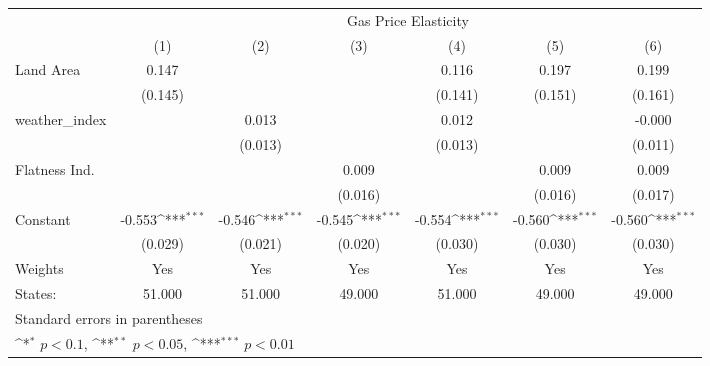 {
\def\sym#1{\ifmmode^{#1}\else\(^{#1}\)\fi}
\begin{tabular}{l*{6}{c}}
\hline\hline
            &\multicolumn{6}{c}{Gas Price Elasticity}                                                                                           \\
            &\multicolumn{1}{c}{(1)}         &\multicolumn{1}{c}{(2)}         &\multicolumn{1}{c}{(3)}         &\multicolumn{1}{c}{(4)}         &\multicolumn{1}{c}{(5)}         &\multicolumn{1}{c}{(6)}         \\
\hline
Land Area   &       0.147         &                     &                     &       0.116         &       0.197         &       0.199         \\
            &     (0.145)         &                     &                     &     (0.141)         &     (0.151)         &     (0.161)         \\
[1em]
weather\_index&                     &       0.013         &                     &       0.012         &                     &      -0.000         \\
            &                     &     (0.013)         &                     &     (0.013)         &                     &     (0.011)         \\
[1em]
Flatness Ind.&                     &                     &       0.009         &                     &       0.009         &       0.009         \\
            &                     &                     &     (0.016)         &                     &     (0.016)         &     (0.017)         \\
[1em]
Constant    &      -0.553\sym{***}&      -0.546\sym{***}&      -0.545\sym{***}&      -0.554\sym{***}&      -0.560\sym{***}&      -0.560\sym{***}\\
            &     (0.029)         &     (0.021)         &     (0.020)         &     (0.030)         &     (0.030)         &     (0.030)         \\
\hline
Weights     &         Yes         &         Yes         &         Yes         &         Yes         &         Yes         &         Yes         \\
States:     &      51.000         &      51.000         &      49.000         &      51.000         &      49.000         &      49.000         \\
\hline\hline
\multicolumn{7}{l}{\footnotesize Standard errors in parentheses}\\
\multicolumn{7}{l}{\footnotesize \sym{*} \(p<0.1\), \sym{**} \(p<0.05\), \sym{***} \(p<0.01\)}\\
\end{tabular}
}
